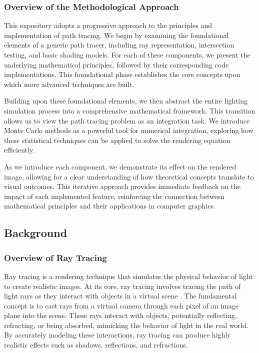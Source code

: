 \documentclass[12pt]{article}
\begin{document}
\subsubsection{Overview of the Methodological Approach}
This expository adopts a progressive approach to the principles and implementation of path tracing.
We begin by examining the foundational elements of a generic path tracer, including ray representation, intersection testing, and basic shading models. For each of these components, we present the underlying mathematical principles, followed by their corresponding code implementations. This foundational phase establishes the core concepts upon which more advanced techniques are built.

Building upon these foundational elements, we then abstract the entire lighting simulation process into a comprehensive mathematical framework. This transition allows us to view the path tracing problem as an integration task. We introduce Monte Carlo methods as a powerful tool for numerical integration, exploring how these statistical techniques can be applied to solve the rendering equation efficiently.

As we introduce each component, we demonstrate its effect on the rendered image, allowing for a clear understanding of how theoretical concepts translate to visual outcomes. This iterative approach provides immediate feedback on the impact of each implemented feature, reinforcing the connection between mathematical principles and their applications in computer graphics.

\subsection{Background}
\subsubsection{Overview of Ray Tracing}
Ray tracing is a rendering technique that simulates the physical behavior of light to create realistic images. At its core, ray tracing involves tracing the path of light rays as they interact with objects in a virtual scene \cite{Glassner1989}.
The fundamental concept is to cast rays from a virtual camera through each pixel of an image plane into the scene. These rays interact with objects, potentially reflecting, refracting, or being absorbed, mimicking the behavior of light in the real world. By accurately modeling these interactions, ray tracing can produce highly realistic effects such as shadows, reflections, and refractions.
\end{document}
